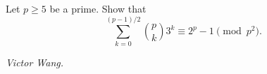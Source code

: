 Let $p\ge5$ be a prime. Show that
\[\sum_{k=0}^{(p-1)/2}\binom{p}{k}3^k\equiv 2^p - 1\pmod{p^2}.\]

\textit{Victor Wang.}